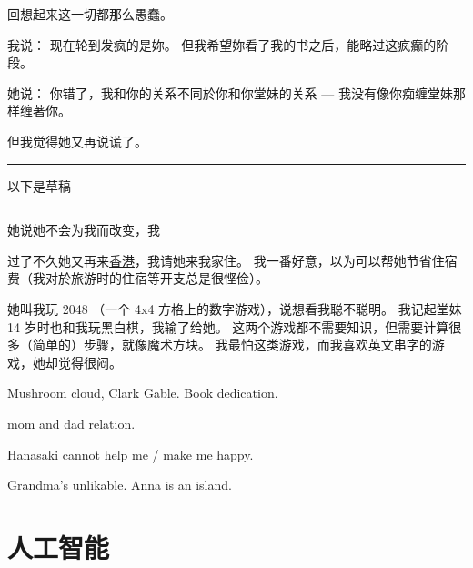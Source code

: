 \documentclass[12pt]{report}
\newcommand*\todo{\begin{center}\color{red}  \rule{5cm}{0.5pt} 以下是草稿\, \rule{5cm}{0.5pt} \end{center}}
\begin{document}
{回想起来这一切都那么愚蠢。

我说： 现在轮到发疯的是妳。  但我希望妳看了我的书之后，能略过这疯癫的阶段。

她说： 你错了，我和你的关系不同於你和你堂妹的关系 --- 我没有像你痴缠堂妹那样缠著你。

但我觉得她又再说谎了。

\todo

她说她不会为我而改变，我

过了不久她又再来\uline{香港}，我请她来我家住。 我一番好意，以为可以帮她节省住宿费（我对於旅游时的住宿等开支总是很悭俭）。


她叫我玩 2048 （一个 4x4 方格上的数字游戏），说想看我聪不聪明。 我记起堂妹 14 岁时也和我玩黑白棋，我输了给她。  这两个游戏都不需要知识，但需要计算很多（简单的）步骤，就像魔术方块。  我最怕这类游戏，而我喜欢英文串字的游戏，她却觉得很闷。

Mushroom cloud, Clark Gable.  Book dedication.

mom and dad relation.

Hanasaki cannot help me / make me happy.

Grandma's unlikable.  Anna is an island.

\chapter{人工智能}

}
\end{document}
